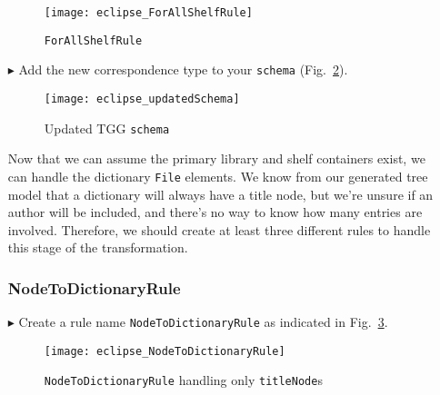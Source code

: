 \begin{itemize}
\vspace{0.5cm}

\begin{figure}[htbp]
\begin{center}
  \texttt{[image: eclipse\_ForAllShelfRule]}
  \caption{\texttt{ForAllShelfRule}}
  \label{eclipse:ForAllShelvesRule}
\end{center}
\end{figure}

\item[$\blacktriangleright$] Add the new correspondence type to your \texttt{schema} (Fig.~\ref{eclipse:updatedSchema}).

\vspace{0.5cm}

\begin{figure}[h!]
\begin{center}
  \texttt{[image: eclipse\_updatedSchema]}
  \caption{Updated TGG \texttt{schema}}
  \label{eclipse:updatedSchema}
\end{center}
\end{figure}

\newpage

Now that we can assume the primary library and shelf containers exist, we can handle the dictionary \texttt{File} elements. We know from our generated
tree model that a dictionary will always have a title node, but we're unsure if an author will be included, and there's no way to know how many entries are
involved. Therefore, we should create at least three different rules to handle this stage of the transformation. 

\subsubsection{NodeToDictionaryRule} %

\item[$\blacktriangleright$] Create a rule name \texttt{NodeToDictionaryRule} as indicated in Fig.~\ref{eclipse:NodeToDictionaryRule}.

\vspace{0.5cm}

\begin{figure}[htbp]
\begin{center}
  \texttt{[image: eclipse\_NodeToDictionaryRule]}
  \caption{\texttt{NodeToDictionaryRule} handling only \texttt{titleNode}s}
  \label{eclipse:NodeToDictionaryRule}
\end{center}
\end{figure}


\end{itemize}
